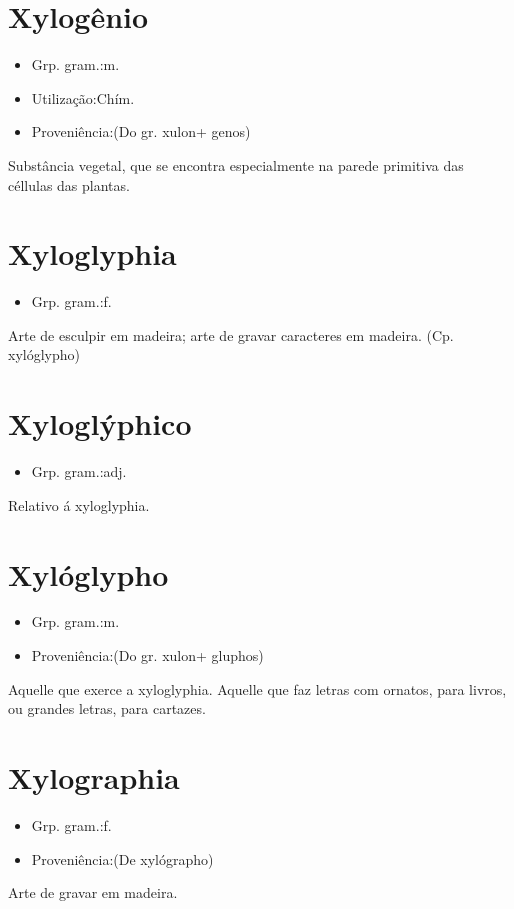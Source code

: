 \section{Xylogênio}
\begin{itemize}
\item {Grp. gram.:m.}
\end{itemize}
\begin{itemize}
\item {Utilização:Chím.}
\end{itemize}
\begin{itemize}
\item {Proveniência:(Do gr. \textunderscore xulon\textunderscore  + \textunderscore genos\textunderscore )}
\end{itemize}
Substância vegetal, que se encontra especialmente na parede primitiva das céllulas das plantas.
\section{Xyloglyphia}
\begin{itemize}
\item {Grp. gram.:f.}
\end{itemize}
Arte de esculpir em madeira; arte de gravar caracteres em madeira.
(Cp. \textunderscore xylóglypho\textunderscore )
\section{Xyloglýphico}
\begin{itemize}
\item {Grp. gram.:adj.}
\end{itemize}
Relativo á xyloglyphia.
\section{Xylóglypho}
\begin{itemize}
\item {Grp. gram.:m.}
\end{itemize}
\begin{itemize}
\item {Proveniência:(Do gr. \textunderscore xulon\textunderscore  + \textunderscore gluphos\textunderscore )}
\end{itemize}
Aquelle que exerce a xyloglyphia.
Aquelle que faz letras com ornatos, para livros, ou grandes letras, para cartazes.
\section{Xylographia}
\begin{itemize}
\item {Grp. gram.:f.}
\end{itemize}
\begin{itemize}
\item {Proveniência:(De \textunderscore xylógrapho\textunderscore )}
\end{itemize}
Arte de gravar em madeira.
